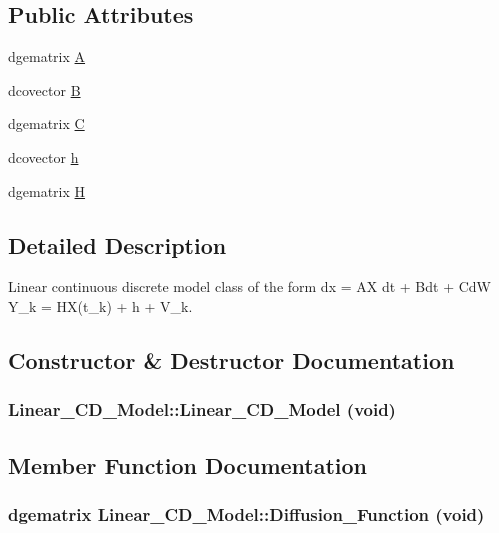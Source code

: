\subsection*{Public Attributes}
\begin{CompactItemize}
\item 
dgematrix \hyperlink{class_linear___c_d___model_d64d1305f494961cffd5d66cb3d24402}{A}
\item 
dcovector \hyperlink{class_linear___c_d___model_57d5af4675a8f42aeefa2bd393b4a7a9}{B}
\item 
dgematrix \hyperlink{class_linear___c_d___model_f2f4e6e226be8baf21fc70e83364a133}{C}
\item 
dcovector \hyperlink{class_linear___c_d___model_78bc761f7ba4b7046a16c73bc6397a86}{h}
\item 
dgematrix \hyperlink{class_linear___c_d___model_2627e7fc3df30be48f3836ebca15eb1d}{H}
\end{CompactItemize}


\subsection{Detailed Description}
Linear continuous discrete model class of the form dx = AX dt + Bdt + CdW Y\_\-k = HX(t\_\-k) + h + V\_\-k. 

\subsection{Constructor \& Destructor Documentation}
\hypertarget{class_linear___c_d___model_aff713973f904c1a509373259ffb2275}{
\subsubsection[{Linear\_\-CD\_\-Model}]{\setlength{\rightskip}{0pt plus 5cm}Linear\_\-CD\_\-Model::Linear\_\-CD\_\-Model (void)}}
\label{class_linear___c_d___model_aff713973f904c1a509373259ffb2275}




\subsection{Member Function Documentation}
\hypertarget{class_linear___c_d___model_f6959eff1f30ff1772b05a45c5756054}{
\subsubsection[{Diffusion\_\-Function}]{\setlength{\rightskip}{0pt plus 5cm}dgematrix Linear\_\-CD\_\-Model::Diffusion\_\-Function (void)}}
\label{class_linear___c_d___model_f6959eff1f30ff1772b05a45c5756054}


